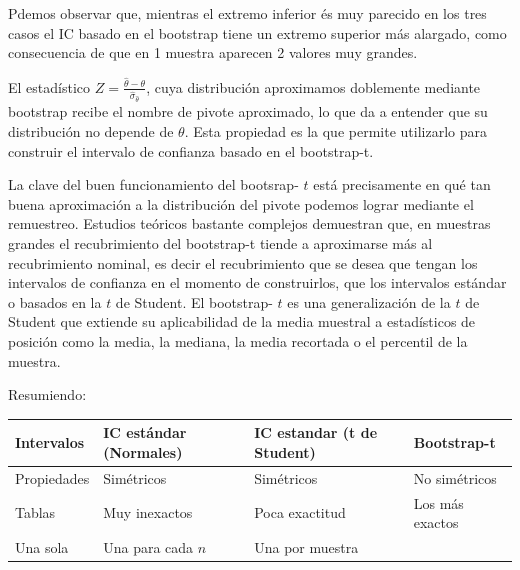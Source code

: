 \documentclass[
]{article}
\begin{document}
Pdemos observar que, mientras el extremo inferior és muy parecido en los tres casos el IC basado en el bootstrap tiene un extremo superior más alargado, como consecuencia de que en 1 muestra aparecen 2 valores muy grandes.

El estadístico \(Z=\frac{\hat{\theta}-\theta}{\widehat{\sigma}_{\hat{\theta}}}\), cuya distribución aproximamos doblemente mediante bootstrap recibe el nombre de pivote aproximado, lo que da a entender
que su distribución no depende de \(\theta\). Esta propiedad es la que permite utilizarlo para construir el intervalo de confianza basado en el bootstrap-t.

La clave del buen funcionamiento del bootsrap- \(t\) está precisamente en qué tan buena aproximación a la distribución del pivote podemos lograr mediante el remuestreo. Estudios teóricos bastante complejos demuestran que, en muestras grandes el recubrimiento del bootstrap-t tiende a aproximarse más al recubrimiento nominal, es decir el recubrimiento que se desea que tengan los intervalos de confianza en el momento de construirlos, que los intervalos estándar o basados en la \(t\) de Student. El bootstrap- \(t\) es una generalización de la \(t\) de Student que extiende su aplicabilidad de la media muestral a estadísticos de posición como la media, la mediana, la media recortada o el percentil de la muestra.

Resumiendo:

\begin{longtable}[]{@{}
  >{\raggedright\arraybackslash}p{}
  >{\raggedright\arraybackslash}p{}
  >{\raggedright\arraybackslash}p{}
  >{\raggedright\arraybackslash}p{}@{}}
\toprule\noalign{}
\begin{minipage}[b]{\linewidth}\raggedright
Intervalos
\end{minipage} & \begin{minipage}[b]{\linewidth}\raggedright
IC estándar (Normales)
\end{minipage} & \begin{minipage}[b]{\linewidth}\raggedright
IC estandar (t de Student)
\end{minipage} & \begin{minipage}[b]{\linewidth}\raggedright
Bootstrap-t
\end{minipage} \\
\midrule\noalign{}
\endhead
\bottomrule\noalign{}
\endlastfoot
Propiedades & Simétricos & Simétricos & No simétricos \\
Tablas & Muy inexactos & Poca exactitud & Los más exactos \\
Una sola & Una para cada \(n\) & Una por muestra & \\
\end{longtable}
\end{document}
